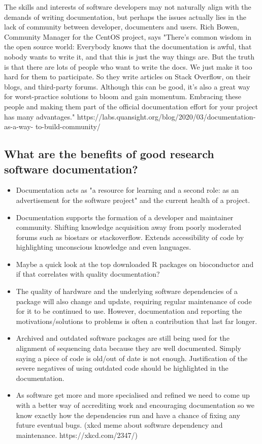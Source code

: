 \documentclass{SBCbookchapter}
\begin{document}
The skills and interests of software developers may not naturally align with the demands of writing documentation, but perhaps the issues actually lies in the lack of community between developer, documenters and users.
Rich Bowen, Community Manager for the CentOS project,  says "There’s common wisdom in the open source world: Everybody knows that the documentation is awful, that nobody wants to write it, and that this is just the way things are. But the truth is that there are lots of people who want to write the docs. We just make it too hard for them to participate. So they write articles on Stack Overflow, on their blogs, and third-party forums. Although this can be good, it’s also a great way for worst-practice solutions to bloom and gain momentum. Embracing these people and making them part of the official documentation effort for your project has many advantages." https://labs.quansight.org/blog/2020/03/documentation-as-a-way- to-build-community/

\subsection{What are the benefits of good research software documentation?}
\begin{itemize}
    \item Documentation acts as "a resource for learning and a second role: as an advertisement for the software project" and the current health of a project.\cite{Geiger2018}
    \item Documentation supports the formation of a developer and maintainer community. Shifting knowledge acquisition away from poorly moderated forums such as biostars or stackoverflow. Extends accessibility of code by highlighting unconscious knowledge and even languages.
    \item Maybe a quick look at the top downloaded R packages on bioconductor and if that correlates with quality documentation?
    \item The quality of hardware and the underlying software dependencies of a package will also change and update, requiring regular maintenance of code for it to be continued to use. However, documentation and reporting the motivations/solutions to problems is often a contribution that last far longer.
    \item Archived and outdated software packages are still being used for the alignment of sequencing data because they are well documented. Simply saying a piece of code is old/out of date is not enough. Justification of the severe negatives of using outdated code should be highlighted in the documentation.
    \item As software get more and more specialised and refined we need to come up with a better way of accrediting work and encouraging documentation so we know exactly how the dependencies run and have a chance of fixing any future eventual bugs. (xkcd meme about software dependency and maintenance. https://xkcd.com/2347/)
\end{itemize}
\end{document}
